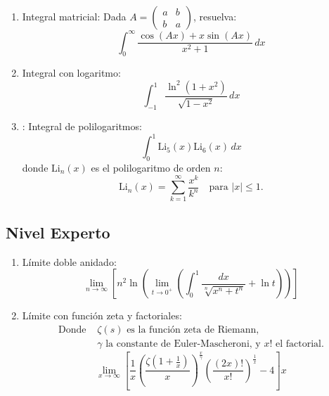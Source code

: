 \documentclass[10pt,a4paper]{article}
\newcommand{\eulerGamma}{\gamma} %
\newcommand{\riemannZeta}{\zeta} %
\newcommand{\polylog}[2]{\text{Li}_{#1}(#2)} %
\begin{document}
\begin{enumerate}
	\item Integral matricial: Dada \( A = \begin{pmatrix}
		      a & b \\
		      b & a
	      \end{pmatrix} \), resuelva:
	      \[
		      \int_0^\infty \frac{\cos(Ax) + x \sin(Ax)}{x^2 + 1} \, dx
	      \]

	\item Integral con logaritmo:
	      \[
		      \int_{-1}^1 \frac{\ln^2(1+x^2)}{\sqrt{1-x^2}} \, dx
	      \]

	\item  : Integral de polilogaritmos:
	      \[
		      \int_0^1 \polylog{5}{x} \polylog{6}{x} \, dx
	      \]
	      donde \( \polylog{n}{x} \) es el polilogaritmo de orden \( n \):
	      \[
		      \polylog{n}{x} = \sum_{k=1}^\infty \frac{x^k}{k^n} \quad \text{para } |x| \leq 1.
	      \]
\end{enumerate}

\subsection*{Nivel Experto}

\begin{enumerate}
	\item Límite doble anidado:
	      \[
		      \lim_{n \to \infty} \left[ n^2 \ln \left( \lim_{t \to 0^+} \left( \int_0^1 \frac{dx}{\sqrt[n]{x^n + t^n}} + \ln t \right) \right) \right]
	      \]

	\item Límite con función zeta y factoriales:
	      \begin{align*}
		      \text{Donde } & \riemannZeta(s) \text{ es la función zeta de Riemann,}                            \\
		                    & \eulerGamma \text{ la constante de Euler-Mascheroni, y } x! \text{ el factorial.}
	      \end{align*}
	      \[
		      \lim_{x \to \infty} \left[ \frac{1}{x} \left( \frac{\riemannZeta(1 + \frac{1}{x})}{x} \right)^{\frac{x}{\eulerGamma}} \left( \frac{(2x)!}{x!} \right)^{\frac{1}{x}} - 4 \right] x
	      \]
\end{enumerate}
\end{document}
